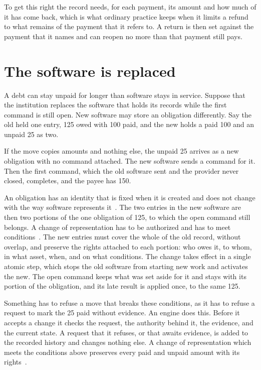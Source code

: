 \documentclass{momentum}
\begin{document}
To get this right the record needs, for each payment, its amount and how much of it has come back, which is what ordinary practice keeps when it limits a refund to what remains of the payment that it refers to. A return is then set against the payment that it names and can reopen no more than that payment still pays.

\section{The software is replaced}
\label{sec:carriage}

A debt can stay unpaid for longer than software stays in service. Suppose that the institution replaces the software that holds its records while the first command is still open. New software may store an obligation differently. Say the old held one entry, 125 owed with 100 paid, and the new holds a paid 100 and an unpaid 25 as two.

If the move copies amounts and nothing else, the unpaid 25 arrives as a new obligation with no command attached. The new software sends a command for it. Then the first command, which the old software sent and the provider never closed, completes, and the payee has 150.

An obligation has an identity that is fixed when it is created and does not change with the way software represents it~\cite{aot}. The two entries in the new software are then two portions of the one obligation of 125, to which the open command still belongs. A change of representation has to be authorized and has to meet conditions~\cite[Section~7]{aot}. The new entries must cover the whole of the old record, without overlap, and preserve the rights attached to each portion: who owes it, to whom, in what asset, when, and on what conditions. The change takes effect in a single atomic step, which stops the old software from starting new work and activates the new. The open command keeps what was set aside for it and stays with its portion of the obligation, and its late result is applied once, to the same 125.

Something has to refuse a move that breaks these conditions, as it has to refuse a request to mark the 25 paid without evidence. An engine does this. Before it accepts a change it checks the request, the authority behind it, the evidence, and the current state. A request that it refuses, or that awaits evidence, is added to the recorded history and changes nothing else. A change of representation which meets the conditions above preserves every paid and unpaid amount with its rights~\cite[Section~7]{aot}.
\end{document}
